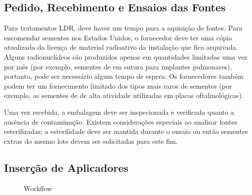 \documentclass[11pt,a4paper]{article}
\newcounter{exemplo}
\begin{document}
\subsection*{Pedido, Recebimento e Ensaios das Fontes}

	Para tratamentos LDR, deve haver um tempo para a aquisição de fontes. Para encomendar sementes nos Estados Unidos, o fornecedor deve ter uma cópia atualizada da licença de material radioativo da instalação que fica arquivada. Alguns radionuclídeos são produzidos apenas em quantidades limitadas uma vez por mês (por exemplo, sementes de  em sutura para implantes pulmonares), portanto, pode ser necessário algum tempo de espera. Os fornecedores também podem ter um fornecimento limitado dos tipos mais raros de sementes (por exemplo, as sementes de  de alta atividade utilizadas em placas oftalmológicas). 

	Uma vez recebida, a embalagem deve ser inspecionada e verificada quanto a ausência de contaminação. Existem considerações especiais ao analisar fontes esterilizadas; a esterilidade deve ser mantida durante o ensaio ou então sementes extras do mesmo lote devem ser solicitadas para este fim.

\subsection*{Inserção de Aplicadores}

	\begin{figure}
		\centering
		\caption{Workflow}
		\label{fig:workflowBraquiterapia}
	\end{figure}
\end{document}
